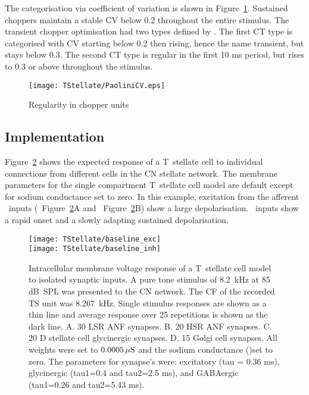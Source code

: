 The categorisation via coefficient of variation is shown in Figure~\ref{fig:PaoliniCVdata}.
Sustained choppers maintain a stable CV below 0.2 throughout the entire stimulus. The transient chopper optimisation had two types defined by \citep{PaoliniClareyEtAl:2005}.
The first CT type is categorised with CV starting below 0.2 then rising, hence the name transient, but stays below 0.3.
The second CT type is regular in the first 10 ms period, but rises to 0.3 or above throughout the stimulus.

\begin{figure}[htb]
\centering%
\texttt{[image: TStellate/PaoliniCV.eps]}
\caption{Regularity in chopper units \citep[Data reproduced from Fig.~2,~][]{PaoliniClareyEtAl:2005}}
\label{fig:PaoliniCVdata}
\end{figure}


\subsection{Implementation}


Figure~\ref{fig:TSinputs} shows the expected response of a T~stellate cell to individual connections from different cells in the CN stellate network.
The membrane parameters for the single compartment T~stellate cell model are default except for sodium conductance set to zero.
In this example, excitation from the afferent \ANF~inputs (\LSR~Figure~\ref{fig:TSinputs}A and \HSR~Figure~\ref{fig:TSinputs}B) show a large depolarisation.
\HSR~inputs show a rapid onset and a slowly adapting sustained depolarisation.




\begin{figure}[htb]
\centering%
\texttt{[image: TStellate/baseline\_exc]}\\
\texttt{[image: TStellate/baseline\_inh]}
\caption[Response of T~stellate cells to isolated synaptic inputs]%
{Intracellular membrane voltage response of a T~stellate cell model to isolated synaptic inputs.
A pure tone stimulus of 8.2~kHz at 85 dB~SPL was presented to the CN network. The CF of the recorded TS unit was 8.267~kHz.
Single stimulus responses are shown as a thin line and average response over 25 repetitions is shown as the dark line.
A. 30 LSR ANF synapses.
B. 20 HSR ANF synapses.
C. 20 D stellate cell glycinergic synapses.
D. 15 Golgi cell \GABAa synapses.
All weights were set to $0.0005\,\mu{\rm S}$ and the sodium conductance (\gNa)set to zero.
The parameters for synapse's were: excitatory (tau = 0.36 ms), glycinergic (tau1=0.4 and tau2=2.5 ms), and GABAergic (tau1=0.26 and tau2=5.43 ms).\label{fig:TSinputs}}
\end{figure}

